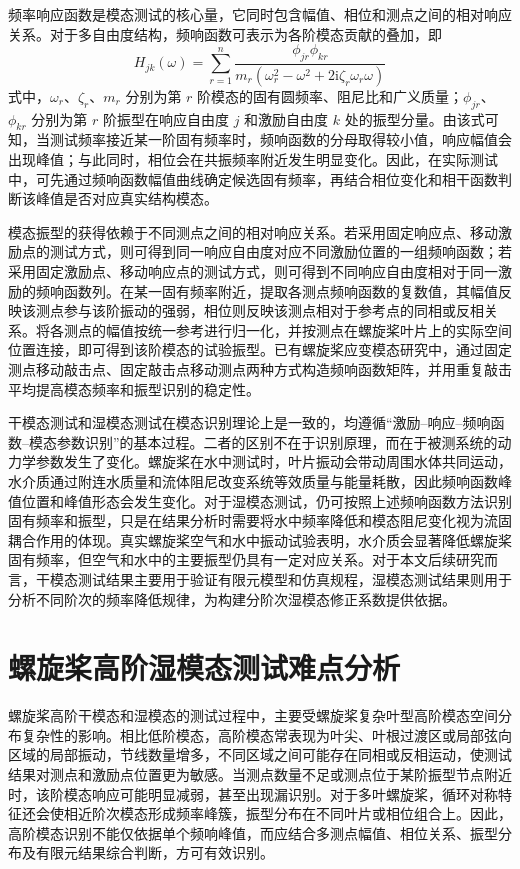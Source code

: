 频率响应函数是模态测试的核心量，它同时包含幅值、相位和测点之间的相对响应关系。对于多自由度结构，频响函数可表示为各阶模态贡献的叠加，即
\begin{equation}
  H_{jk}(\omega) = \sum_{r=1}^{n} \frac{\phi_{jr}\phi_{kr}}{m_r\left(\omega_r^2 - \omega^2 + 2\mathrm{i}\zeta_r\omega_r\omega\right)}
\end{equation}
式中，$\omega_r$、$\zeta_r$、$m_r$ 分别为第 $r$ 阶模态的固有圆频率、阻尼比和广义质量；$\phi_{jr}$、$\phi_{kr}$ 分别为第 $r$ 阶振型在响应自由度 $j$ 和激励自由度 $k$ 处的振型分量。由该式可知，当测试频率接近某一阶固有频率时，频响函数的分母取得较小值，响应幅值会出现峰值；与此同时，相位会在共振频率附近发生明显变化。因此，在实际测试中，可先通过频响函数幅值曲线确定候选固有频率，再结合相位变化和相干函数判断该峰值是否对应真实结构模态。

模态振型的获得依赖于不同测点之间的相对响应关系。若采用固定响应点、移动激励点的测试方式，则可得到同一响应自由度对应不同激励位置的一组频响函数；若采用固定激励点、移动响应点的测试方式，则可得到不同响应自由度相对于同一激励的频响函数列。在某一固有频率附近，提取各测点频响函数的复数值，其幅值反映该测点参与该阶振动的强弱，相位则反映该测点相对于参考点的同相或反相关系。将各测点的幅值按统一参考进行归一化，并按测点在螺旋桨叶片上的实际空间位置连接，即可得到该阶模态的试验振型。已有螺旋桨应变模态研究中，通过固定测点移动敲击点、固定敲击点移动测点两种方式构造频响函数矩阵，并用重复敲击平均提高模态频率和振型识别的稳定性\cite{test:24}。

干模态测试和湿模态测试在模态识别理论上是一致的，均遵循“激励--响应--频响函数--模态参数识别”的基本过程。二者的区别不在于识别原理，而在于被测系统的动力学参数发生了变化。螺旋桨在水中测试时，叶片振动会带动周围水体共同运动，水介质通过附连水质量和流体阻尼改变系统等效质量与能量耗散，因此频响函数峰值位置和峰值形态会发生变化。对于湿模态测试，仍可按照上述频响函数方法识别固有频率和振型，只是在结果分析时需要将水中频率降低和模态阻尼变化视为流固耦合作用的体现。真实螺旋桨空气和水中振动试验表明，水介质会显著降低螺旋桨固有频率，但空气和水中的主要振型仍具有一定对应关系\cite{sim:21}。对于本文后续研究而言，干模态测试结果主要用于验证有限元模型和仿真规程，湿模态测试结果则用于分析不同阶次的频率降低规律，为构建分阶次湿模态修正系数提供依据。

\section{螺旋桨高阶湿模态测试难点分析}

螺旋桨高阶干模态和湿模态的测试过程中，主要受螺旋桨复杂叶型高阶模态空间分布复杂性的影响。相比低阶模态，高阶模态常表现为叶尖、叶根过渡区或局部弦向区域的局部振动，节线数量增多，不同区域之间可能存在同相或反相运动，使测试结果对测点和激励点位置更为敏感。当测点数量不足或测点位于某阶振型节点附近时，该阶模态响应可能明显减弱，甚至出现漏识别。对于多叶螺旋桨，循环对称特征还会使相近阶次模态形成频率峰簇，振型分布在不同叶片或相位组合上\cite{test:24}。因此，高阶模态识别不能仅依据单个频响峰值，而应结合多测点幅值、相位关系、振型分布及有限元结果综合判断，方可有效识别。

